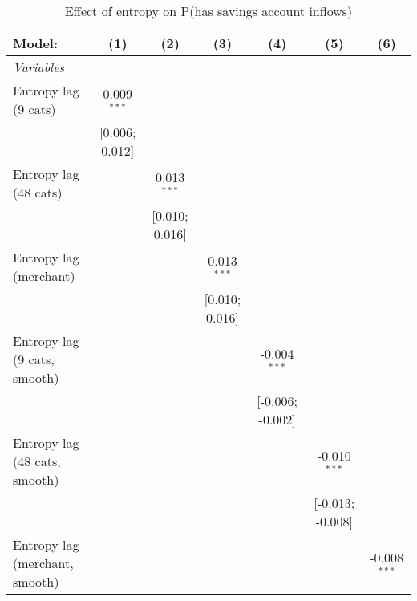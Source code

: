 
\begin{table}[htbp]
   \centering
   \tiny
   \begin{threeparttable}[b]
      \caption{\label{tab:reg_has_inflows_cnz} Effect of entropy on P(has savings account inflows)}
      \begin{tabular}{lcccccc}
         \tabularnewline \midrule \midrule
         Model:                         & (1)             & (2)             & (3)             & (4)              & (5)              & (6)\\  
         \midrule
         \emph{Variables}\\
         Entropy lag (9 cats)           & 0.009$^{***}$   &                 &                 &                  &                  &   \\   
                                        & [0.006; 0.012]  &                 &                 &                  &                  &   \\   
         Entropy lag (48 cats)          &                 & 0.013$^{***}$   &                 &                  &                  &   \\   
                                        &                 & [0.010; 0.016]  &                 &                  &                  &   \\   
         Entropy lag (merchant)         &                 &                 & 0.013$^{***}$   &                  &                  &   \\   
                                        &                 &                 & [0.010; 0.016]  &                  &                  &   \\   
         Entropy lag (9 cats, smooth)   &                 &                 &                 & -0.004$^{***}$   &                  &   \\   
                                        &                 &                 &                 & [-0.006; -0.002] &                  &   \\   
         Entropy lag (48 cats, smooth)  &                 &                 &                 &                  & -0.010$^{***}$   &   \\   
                                        &                 &                 &                 &                  & [-0.013; -0.008] &   \\   
         Entropy lag (merchant, smooth) &                 &                 &                 &                  &                  & -0.008$^{***}$\\   

\end{tabular}
\end{threeparttable}
\end{table}
